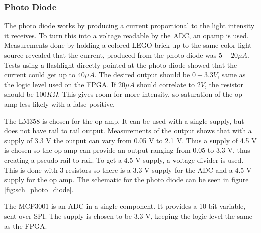 \subsubsection{Photo Diode}
The photo diode works by producing a current proportional to the light intensity it receives.
To turn this into a voltage readable by the ADC, an opamp is used.
Measurements done by holding a colored LEGO brick up to the same color light source revealed that the current, produced from the photo diode was $5-20 \mu A$.
Tests using a flashlight directly pointed at the photo diode showed that the current could get up to $40 \mu A$.
The desired output should be $0-3.3 V$, same as the logic level used on the FPGA.
If $20 \mu A$ should correlate to $2 V$, the resistor should be $100K\Omega$. 
This gives room for more intensity, so saturation of the op amp less likely with a false positive.

The LM358 is chosen for the op amp.
It can be used with a single supply, but does not have rail to rail output.
Measurements of the output shows that with a supply of 3.3 V the output can vary from 0.05 V to 2.1 V.
Thus a supply of 4.5 V is chosen so the op amp can provide an output ranging from 0.05 to 3.3 V, thus creating a pseudo rail to rail.
To get a 4.5 V supply, a voltage divider is used. This is done with 3 resistors so there is a 3.3 V supply for the ADC and a 4.5 V supply for the op amp.
The schematic for the photo diode can be seen in figure \ref{fig:sch_photo_diode}.

The MCP3001 is an ADC in a single component.
It provides a 10 bit variable, sent over SPI.
The supply is chosen to be 3.3 V, keeping the logic level the same as the FPGA.


